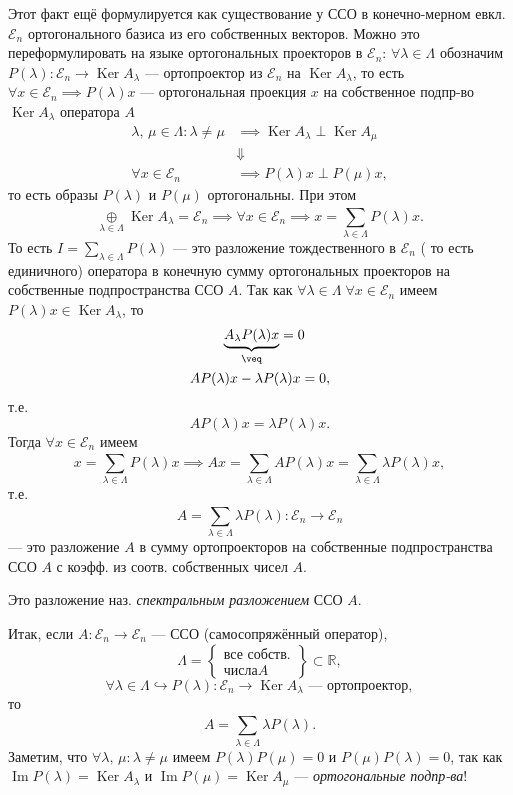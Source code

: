 Этот факт ещё формулируется как существование у ССО
в конечно-мерном евкл. $\mathcal{E}_n$ ортогонального базиса
из его собственных векторов. Можно это переформулировать
на языке ортогональных  проекторов в $\mathcal{E}_n$:
$\forall \lambda \in  \Lambda$ обозначим $P(\lambda):
 \mathcal{E}_n \to  \operatorname{Ker}A_\lambda$ --- ортопроектор
 из $\mathcal{E}_n$ на $\operatorname{Ker}A_\lambda$,
 то есть $\forall x \in  \mathcal{E}_n \implies P(\lambda) x$ ---
 ортогональная проекция $x$ на собственное подпр-во
$\operatorname{Ker}A_\lambda$ оператора $A$
 \begin{align*}
	  \lambda,\, \mu \in  \Lambda : \lambda \neq \mu &\implies
	 \operatorname{Ker} A_{\lambda} \perp \operatorname{Ker}A_\mu \\
&\Downarrow \\
	 \forall x \in \mathcal{E}_n &\implies P(\lambda) x
\perp P(\mu) x,\end{align*} 
то есть образы  $P(\lambda)$ и $P(\mu)$ ортогональны.
При этом 
\[
	\underset{\lambda \in \Lambda}{\oplus} \operatorname{Ker}
	A_\lambda = \mathcal{E}_n \implies \forall
	x \in \mathcal{E}_n \implies x = \sum_{\lambda \in \Lambda}^{
	} P(\lambda) x
.\] 
То есть $I = \sum_{\lambda \in \Lambda}^{} P(\lambda)$ 
--- это разложение тождественного в $\mathcal{E}_n$ ( то есть 
единичного) оператора в конечную сумму ортогональных проекторов
на собственные подпространства ССО $A$. Так как
$\forall \lambda \in  \Lambda \; \forall x \in \mathcal{E}_n$ 
имеем $P(\lambda) x \in  \operatorname{Ker}A_\lambda$, то
\begin{align*}
	\underbrace{A_\lambda P(\lambda) x}_{\veq} &= 0\\
	AP(\lambda)x - \lambda P (&\lambda) x =0
,\end{align*} 
т.\:е.
\[
	AP(\lambda) x = \lambda P(\lambda) x
.\] 
Тогда $\forall x \in  \mathcal{E}_n$ имеем
\[
	x = \sum_{\lambda \in \Lambda}^{} P(\lambda) x
	\implies Ax= \sum_{\lambda \in \Lambda}^{} A P(\lambda) x=
	\sum_{\lambda \in  \Lambda}^{} \lambda P (\lambda) x,
\] 
т.\:е.
\[
	A = \sum_{\lambda \in  \Lambda}^{} \lambda P(\lambda):
	\mathcal{E}_n \to \mathcal{E}_n
\]
--- это разложение $A$ в сумму ортопроекторов на собственные подпространства ССО $A$ с коэфф. из соотв. собственных чисел $A$.
\begin{dfn}
Это разложение наз. \emph{спектральным разложением} ССО $A$.
\end{dfn}
Итак, если $A: \mathcal{E}_n \to \mathcal{E}_{n}$ --- ССО (самосопряжённый оператор),
\[
\Lambda = \left\{ \substack{\text{все собств.}\\
\text{числа} A} \right\}  \subset \mathbb{R}
,\] 
\[
	\forall \lambda \in \Lambda \hookrightarrow P(\lambda)
	: \mathcal{E}_n \to  \operatorname{Ker}A_\lambda
\text{ --- ортопроектор}
,\] 
то
\[
	A = \sum_{\lambda \in \Lambda}^{} \lambda P(\lambda)
.\] 
Заметим, что $\forall \lambda,\,\mu : \lambda \neq \mu$ имеем
$P(\lambda)P(\mu)=0$ и $P(\mu)P(\lambda)=0$, так как
$\operatorname{Im} P(\lambda)= \operatorname{Ker}A_\lambda$ и
$\operatorname{Im}P(\mu)= \operatorname{Ker}A_\mu$ --- \emph{ортогональные подпр-ва}!

